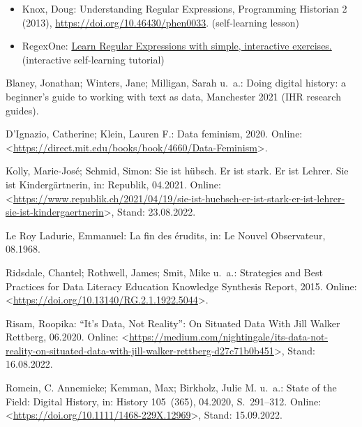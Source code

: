 \documentclass[
  letterpaper,
]{book}
\newlength{\cslhangindent}
\newlength{\cslentryspacingunit} %
\newenvironment{CSLReferences}[2] %
 {%
  \setlength{\parindent}{0pt}
  \ifodd #1
  \let\oldpar\par
  \def\par{\hangindent=\cslhangindent\oldpar}
  \fi
  \setlength{\parskip}{#2\cslentryspacingunit}
 }%
 {}
\begin{document}
\begin{itemize}
\item
  Knox, Doug: Understanding Regular Expressions, Programming Historian 2
  (2013), \url{https://doi.org/10.46430/phen0033}. (self-learning
  lesson)
\item
  RegexOne: \href{https://regexone.com/}{Learn Regular Expressions with
  simple, interactive exercises.} (interactive self-learning tutorial)
\end{itemize}

\hypertarget{refs}{}
\begin{CSLReferences}{0}{0}
\leavevmode{}%
Blaney, Jonathan; Winters, Jane; Milligan, Sarah u.~a.: Doing digital
history: a beginner's guide to working with text as data, Manchester
2021 ({IHR} research guides).

\leavevmode{}%
D'Ignazio, Catherine; Klein, Lauren F.: Data feminism, 2020. Online:
\textless{}\url{https://direct.mit.edu/books/book/4660/Data-Feminism}\textgreater.

\leavevmode{}%
Kolly, Marie-José; Schmid, Simon: Sie ist h{ü}bsch. {Er} ist stark. {Er}
ist {Lehrer}. {Sie} ist {Kinderg{ä}rtnerin}, in: Republik, 04.2021.
Online:
\textless{}\url{https://www.republik.ch/2021/04/19/sie-ist-huebsch-er-ist-stark-er-ist-lehrer-sie-ist-kindergaertnerin}\textgreater,
Stand: 23.08.2022.

\leavevmode{}%
Le Roy Ladurie, Emmanuel: La fin des {é}rudits, in: Le Nouvel
Observateur, 08.1968.

\leavevmode{}%
Ridsdale, Chantel; Rothwell, James; Smit, Mike u.~a.: Strategies and
{Best} {Practices} for {Data} {Literacy} {Education} {Knowledge}
{Synthesis} {Report}, 2015. Online:
\textless{}\url{https://doi.org/10.13140/RG.2.1.1922.5044}\textgreater.

\leavevmode{}%
Risam, Roopika: {``}{It}{'}s {Data}, {Not} {Reality}{''}: {On}
{Situated} {Data} {With} {Jill} {Walker} {Rettberg}, 06.2020. Online:
\textless{}\url{https://medium.com/nightingale/its-data-not-reality-on-situated-data-with-jill-walker-rettberg-d27c71b0b451}\textgreater,
Stand: 16.08.2022.

\leavevmode{}%
Romein, C. Annemieke; Kemman, Max; Birkholz, Julie M. u.~a.: State of
the {Field}: {Digital} {History}, in: History 105~(365), 04.2020,
S.~291--312. Online:
\textless{}\url{https://doi.org/10.1111/1468-229X.12969}\textgreater,
Stand: 15.09.2022.

\end{CSLReferences}


\backmatter
\end{document}
